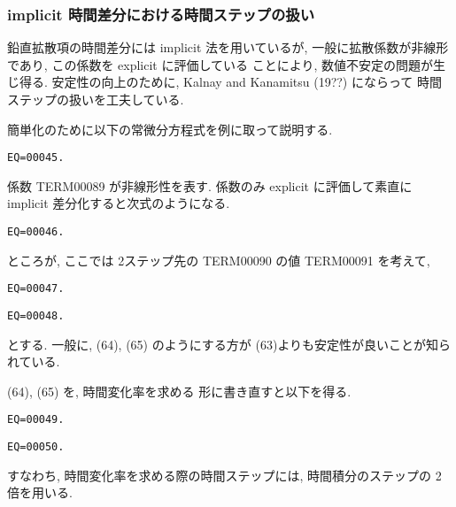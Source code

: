 \subsubsection{implicit 時間差分における時間ステップの扱い}

鉛直拡散項の時間差分には implicit 法を用いているが, 
一般に拡散係数が非線形であり, この係数を explicit に評価している
ことにより, 数値不安定の問題が生じ得る. 
安定性の向上のために, Kalnay and Kanamitsu (19??) にならって
時間ステップの扱いを工夫している. 

簡単化のために以下の常微分方程式を例に取って説明する. 
\begin{verbatim}
EQ=00045.
\end{verbatim}
係数 TERM00089 が非線形性を表す. 
係数のみ explicit に評価して素直に implicit 差分化すると次式のようになる. 
\begin{verbatim}
EQ=00046.
\end{verbatim}
ところが, ここでは 2ステップ先の TERM00090 の値 TERM00091 を考えて, 
\begin{verbatim}
EQ=00047.
\end{verbatim}
\begin{verbatim}
EQ=00048.
\end{verbatim}
とする. 
一般に, (64), (65) のようにする方が
(63)よりも安定性が良いことが知られている. 

(64), (65) を, 時間変化率を求める
形に書き直すと以下を得る. 
\begin{verbatim}
EQ=00049.
\end{verbatim}
\begin{verbatim}
EQ=00050.
\end{verbatim}
すなわち, 時間変化率を求める際の時間ステップには, 
時間積分のステップの 2 倍を用いる. 

